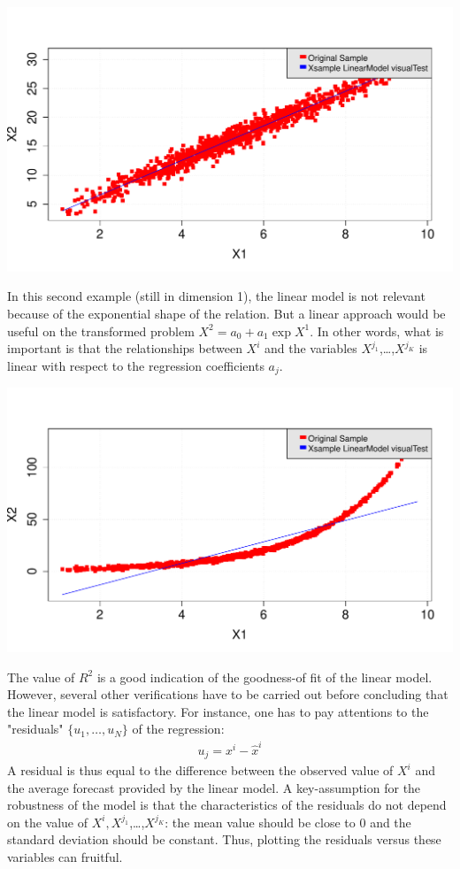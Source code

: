 {  \begin{center}
    \includegraphics[scale=0.45]{Figures/OKlinearRegModel.pdf}
  \end{center}

  In this second example (still in dimension 1), the linear model is not relevant because of the exponential shape of the relation. But a linear approach would be useful on the transformed problem $X^2 = a_0 + a_1 \exp X^1$. In other words, what is important is that the relationships between $X^i$ and the variables $X^{j_1}$,\ldots,$X^{j_K}$ is linear with respect to the regression coefficients $a_j$.

  \begin{center}
    \includegraphics[scale=0.45]{Figures/WronglinearRegModel.pdf}
  \end{center}

  The value of $R^2$ is a good indication of the goodness-of fit of the linear model. However, several other verifications have to be carried out before concluding that the linear model is satisfactory. For instance, one has to pay attentions to the "residuals" $\{ u_1,\ldots,u_N \} $ of the regression:
  \begin{align*}
    u_j = x^i - \widehat{x}^i
  \end{align*}
  A residual is thus equal to the difference between the observed value of $X^i$ and the average forecast provided by the linear model. A key-assumption for the robustness of the model is that the characteristics of the residuals do not depend on the value of $X^i,X^{j_1}$,\ldots,$X^{j_K}$: the mean value should be close to 0 and the standard deviation should be constant. Thus, plotting the residuals versus these variables can fruitful.

}
